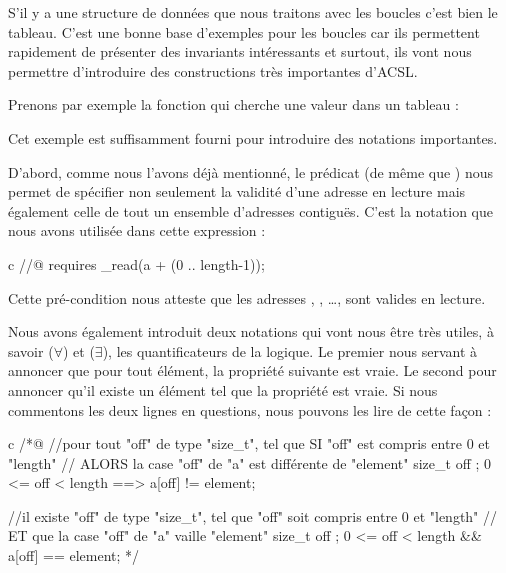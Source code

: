 

S'il y a une structure de données que nous traitons avec les boucles c'est bien
le tableau. C'est une bonne base d'exemples pour les boucles car ils permettent
rapidement de présenter des invariants intéressants et surtout, ils vont nous 
permettre d'introduire des constructions très importantes d'ACSL.



Prenons par exemple la fonction qui cherche une valeur dans un tableau :






Cet exemple est suffisamment fourni pour introduire des notations importantes.



D'abord, comme nous l'avons déjà mentionné, le prédicat  (de 
même que ) nous permet de spécifier non seulement la validité d'une 
adresse en lecture mais également celle de tout un ensemble d'adresses 
contiguës. C'est la notation que nous avons utilisée dans cette expression :



\begin{CodeBlock}{c}
//@ requires \valid_read(a + (0 .. length-1));
\end{CodeBlock}



Cette pré-condition nous atteste que les adresses , 
, \ldots{},  sont valides en lecture.



Nous avons également introduit deux notations qui vont nous être très utiles, à 
savoir  ($\forall$) et  ($\exists$), les 
quantificateurs de la logique. Le premier nous servant à annoncer que pour tout
élément, la propriété suivante est vraie. Le second pour annoncer qu'il existe
un élément tel que la propriété est vraie. Si nous commentons les deux lignes en 
questions, nous pouvons les lire de cette façon :



\begin{CodeBlock}{c}
/*@
//pour tout "off" de type "size_t", tel que SI "off" est compris entre 0 et "length"
//                                 ALORS la case "off" de "a" est différente de "element"
\forall size_t off ; 0 <= off < length ==> a[off] != element;

//il existe "off" de type "size_t", tel que "off" soit compris entre 0 et "length"
//                                 ET que la case "off" de "a" vaille "element"
\exists size_t off ; 0 <= off < length && a[off] == element;
*/
\end{CodeBlock}



